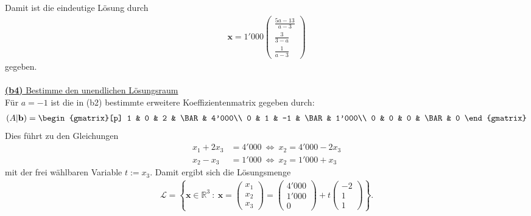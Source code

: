 Damit ist die eindeutige Lösung durch
\begin{align*}
	\mathbf{x}
	=
	1'000 
	\begin{pmatrix}
		 \frac{5a -13}{a-3}\\
		\frac{3}{3-a}\\
		\frac{1}{a-3}
	\end{pmatrix}
\end{align*}
gegeben.\\
\\
\underline{\textbf{(b4)} Bestimme den unendlichen Lösungsraum}\\
Für $ a = -1 $ ist die in (b2) bestimmte erweitere Koeffizientenmatrix gegeben durch:
\begin{align*}
	(A | \mathbf{b}) 
	= 
	\begin{gmatrix}[p]
		1 & 0 & 2 & \BAR & 4'000\\
		0 & 1 & -1 & \BAR & 1'000\\
		0 & 0 & 0  & \BAR & 0
	\end{gmatrix}
\end{align*}
Dies führt zu den Gleichungen
\begin{align*}
	x_1 + 2 x_3 &= 4'000
	\ \Leftrightarrow \ x_2 = 4'000 - 2 x_3
	\\
	x_2 - x_3 &= 1'000
	\ \Leftrightarrow \
	x_2 = 1'000 + x_3
\end{align*}
mit der frei wählbaren Variable $ t:=x_3 $. Damit ergibt sich die Lösungsmenge
\begin{align*}
	\mathcal{L}
	= \left\lbrace
	\mathbf{x} \in \mathbb{R}^3 \ : \
	\mathbf{x} = 
	\begin{pmatrix}
		x_1 \\ x_2 \\ x_3
	\end{pmatrix} 
	=
	\begin{pmatrix}
		4'000\\
		1'000\\
		0
	\end{pmatrix}
	+ t 
	\begin{pmatrix}
		-2\\
		1 \\
		1
	\end{pmatrix}
	\right\rbrace.
\end{align*}

\newpage
